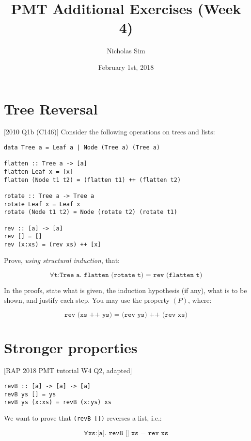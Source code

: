 \documentclass[10pt,a4paper]{article}
\begin{document}
\title{PMT Additional Exercises (Week 4)}
\author{Nicholas Sim}
\date{February 1st, 2018}
\maketitle{}


\section{Tree Reversal}
[2010 Q1b (C146)] Consider the following operations on trees and lists:

\begin{lstlisting}
data Tree a = Leaf a | Node (Tree a) (Tree a)

flatten :: Tree a -> [a]
flatten Leaf x = [x]
flatten (Node t1 t2) = (flatten t1) ++ (flatten t2)

rotate :: Tree a -> Tree a
rotate Leaf x = Leaf x
rotate (Node t1 t2) = Node (rotate t2) (rotate t1)

rev :: [a] -> [a]
rev [] = []
rev (x:xs) = (rev xs) ++ [x]
\end{lstlisting}

Prove, \emph{using structural induction}, that:

\[ \forall \texttt{t:Tree a. flatten (rotate t) = rev (flatten t)} \]

In the proofs, state what is given, the induction hypothesis (if any), 
what is to be shown, and justify each step.
You may use the property \((P)\), where:

\[ \texttt{rev (xs ++ ys) = (rev ys) ++ (rev xs)} \]


\section{Stronger properties}
[RAP 2018 PMT tutorial W4 Q2, adapted]

\begin{lstlisting}
revB :: [a] -> [a] -> [a]
revB ys [] = ys
revB ys (x:xs) = revB (x:ys) xs
\end{lstlisting}

We want to prove that \texttt{(revB [])} reverses a list, i.e.:

\[ \forall \texttt{xs:[a]. revB [] xs = rev xs} \]
\end{document}
